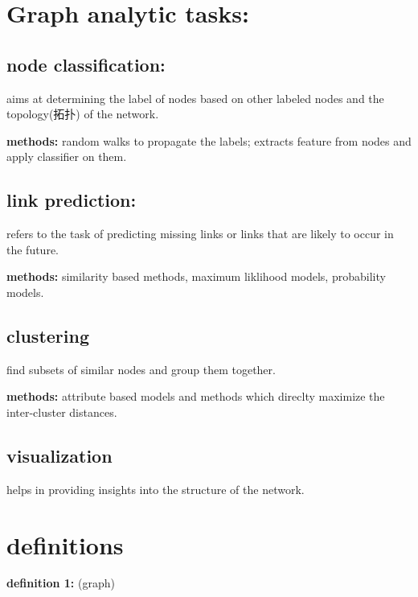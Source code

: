 \documentclass{ctexart}
\begin{document}
	
	\section{Graph analytic tasks:}
	
	\subsection{node classification:}
	
	aims at determining the {\color{red}label of nodes} based on other labeled nodes and the topology(拓扑) of the network.
	
	\textbf{methods: }random walks to propagate the labels; extracts feature from nodes and apply classifier on them.
	
	\subsection{link prediction:}
	
	refers to the task of predicting missing links or links that are likely to occur in the future.
	
	\textbf{methods: }similarity based methods, maximum liklihood models, probability models.
	
	\subsection{clustering}
	
	find subsets of similar nodes and group them together.
	
	\textbf{methods: }attribute based models and methods which direclty maximize the inter-cluster distances.
	
	\subsection{visualization}
	
	helps in providing insights into the structure of the network.
	
	\section{definitions}
	
	\textbf{definition 1: }(graph) 
	
	
	
\end{document}
